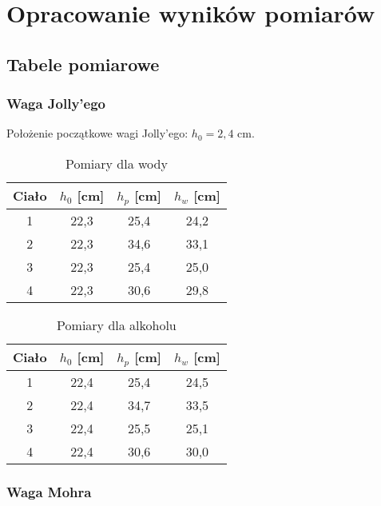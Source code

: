 \documentclass[a4paper,12pt]{article}
\begin{document}
\section{Opracowanie wyników pomiarów}

\subsection{Tabele pomiarowe}

\subsubsection*{Waga Jolly'ego}

Położenie początkowe wagi Jolly'ego: $h_0 = 2{,}4$ cm.

\begin{table}[h]
    \centering
    \begin{tabular}{|c|c|c|c|}
        \hline
        Ciało & $h_0$ [cm] & $h_p$ [cm] & $h_w$ [cm] \\
        \hline
        1 & 22,3 & 25,4 & 24,2 \\
        \hline
        2 & 22,3 & 34,6 & 33,1 \\
        \hline
        3 & 22,3 & 25,4 & 25,0 \\
        \hline
        4 & 22,3 & 30,6 & 29,8 \\
        \hline
    \end{tabular}
    \caption{Pomiary dla wody}
\end{table}

\begin{table}[h]
    \centering
    \begin{tabular}{|c|c|c|c|}
        \hline
        Ciało & $h_0$ [cm] & $h_p$ [cm] & $h_w$ [cm] \\
        \hline
        1 & 22,4 & 25,4 & 24,5 \\
        \hline
        2 & 22,4 & 34,7 & 33,5 \\
        \hline
        3 & 22,4 & 25,5 & 25,1 \\
        \hline
        4 & 22,4 & 30,6 & 30,0 \\
        \hline
    \end{tabular}
    \caption{Pomiary dla alkoholu}
\end{table}

\subsubsection*{Waga Mohra}
\end{document}
